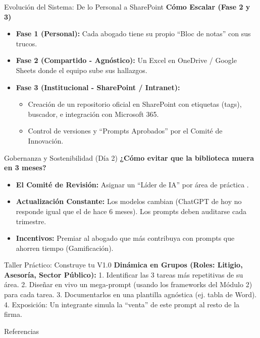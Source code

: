 \documentclass[aspectratio=169]{beamer}
\begin{document}
\begin{frame}{Evolución del Sistema: De lo Personal a SharePoint}
\textbf{Cómo Escalar (Fase 2 y 3)}
\begin{itemize}
  \item \textbf{Fase 1 (Personal):} Cada abogado tiene su propio ``Bloc de notas'' con sus trucos.
  \item \textbf{Fase 2 (Compartido - Agnóstico):} Un Excel en OneDrive / Google Sheets donde el equipo sube sus hallazgos.
  \item \textbf{Fase 3 (Institucional - SharePoint / Intranet):}
  \begin{itemize}
    \item Creación de un repositorio oficial en SharePoint con etiquetas (tags), buscador, e integración con Microsoft 365.
    \item Control de versiones y ``Prompts Aprobados'' por el Comité de Innovación.
  \end{itemize}
\end{itemize}
\end{frame}


\begin{frame}{Gobernanza y Sostenibilidad (Día 2)}
\textbf{¿Cómo evitar que la biblioteca muera en 3 meses?}
\begin{itemize}
  \item \textbf{El Comité de Revisión:} Asignar un ``Líder de IA'' por área de práctica \cite{sal2024}.
  \item \textbf{Actualización Constante:} Los modelos cambian (ChatGPT de hoy no responde igual que el de hace 6 meses). Los prompts deben auditarse cada trimestre.
  \item \textbf{Incentivos:} Premiar al abogado que más contribuya con prompts que ahorren tiempo (Gamificación).
\end{itemize}
\end{frame}


\begin{frame}{Taller Práctico: Construye tu V1.0}
\textbf{Dinámica en Grupos (Roles: Litigio, Asesoría, Sector Público):}
1. Identificar las 3 tareas más repetitivas de su área.
2. Diseñar en vivo un mega-prompt (usando los frameworks del Módulo 2) para cada tarea.
3. Documentarlos en una plantilla agnóstica (ej. tabla de Word).
4. Exposición: Un integrante simula la ``venta'' de este prompt al resto de la firma.
\end{frame}



\begin{frame}[allowframebreaks]{Referencias}
  
  
\end{frame}
\end{document}
